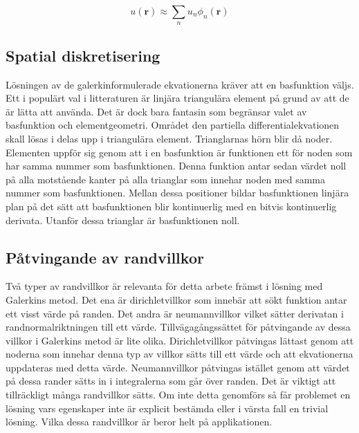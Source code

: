 \begin{equation}
\label{eq:femtheoryansatz}
u(\mathbf{r}) \approx \sum_n u_n \phi_n(\mathbf{r})
\end{equation}


\subsection{Spatial diskretisering}

Lösningen av de galerkinformulerade ekvationerna kräver att en basfunktion väljs.
Ett i populärt val i litteraturen är linjära triangulära element på grund av att de
är lätta att använda. Det är dock bara fantasin som begränsar valet av basfunktion
och elementgeometri.
\cite{johnson2009}\cite{lewis04}\cite{reddy93}\cite{fem50} Området den
partiella differentialekvationen skall lösas i delas upp i triangulära element.
Trianglarnas hörn blir då noder. Elementen uppför sig genom att i en basfunktion
är funktionen ett för noden som har samma nummer som basfunktionen. Denna funktion
antar sedan värdet noll på alla motstående kanter på alla trianglar som innehar noden
med samma nummer som basfunktionen. Mellan dessa positioner bildar basfunktionen
linjära plan på det sätt att basfunktionen blir kontinuerlig med en bitvis
kontinuerlig derivata.
Utanför dessa trianglar är basfunktionen noll. \cite{johnson2009}

\subsection{Påtvingande av randvillkor}
\label{subsec:boundaryenforcement}
Två typer av randvillkor är relevanta för detta arbete främst i lösning med Galerkins 
metod. Det ena är dirichletvillkor som
innebär att sökt funktion antar ett visst värde på randen. Det andra är neumannvillkor
vilket sätter derivatan i randnormalriktningen till ett värde. Tillvägagångssättet
för påtvingande av dessa villkor i Galerkins metod är lite olika. Dirichletvillkor
påtvingas lättast genom att noderna som innehar denna typ av villkor sätts till ett värde
och att ekvationerna uppdateras med detta värde. Neumannvillkor påtvingas istället
genom att värdet på dessa rander sätts in i integralerna som går över randen. Det
är viktigt att tillräckligt många randvillkor sätts. Om inte detta genomförs
så får problemet en lösning vars egenskaper inte är explicit bestämda eller
i värsta fall en trivial lösning. Vilka dessa randvillkor är beror helt
på applikationen.
